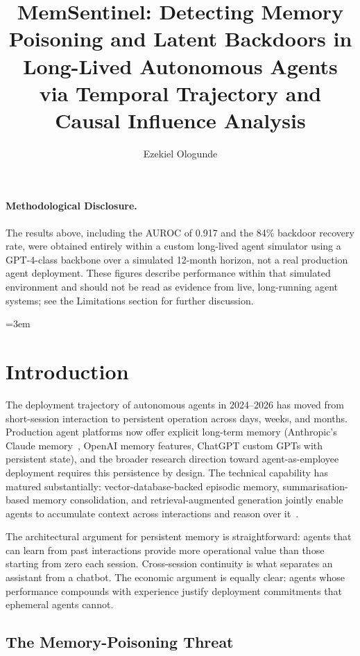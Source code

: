 \documentclass[sigconf,nonacm]{acmart}
\title{MemSentinel: Detecting Memory Poisoning and Latent Backdoors in Long-Lived Autonomous Agents via Temporal Trajectory and Causal Influence Analysis}
\author{Ezekiel Ologunde}
\affiliation{%
  \institution{Independent Researcher}
  \city{Boston}
  \state{MA}
  \country{USA}}
\begin{document}
\maketitle

\paragraph{Methodological Disclosure.} The results above, including the AUROC of 0.917 and the 84\% backdoor recovery rate, were obtained entirely within a custom long-lived agent simulator using a GPT-4-class backbone over a simulated 12-month horizon, not a real production agent deployment. These figures describe performance within that simulated environment and should not be read as evidence from live, long-running agent systems; see the Limitations section for further discussion.

\sloppy
{}
\emergencystretch=3em
\hfuzz=10pt

\section{Introduction}

The deployment trajectory of autonomous agents in 2024--2026 has
moved from short-session interaction to persistent operation
across days, weeks, and months. Production agent platforms now offer
explicit long-term memory (Anthropic's Claude memory~\cite{anthropic2024memory},
OpenAI memory features, ChatGPT custom GPTs with persistent state),
and the broader research direction toward agent-as-employee
deployment requires this persistence by design. The technical
capability has matured substantially: vector-database-backed
episodic memory, summarisation-based memory consolidation, and
retrieval-augmented generation jointly enable agents to accumulate
context across interactions and reason over it~\cite{park2023generative,
xi2024agentsurvey}.

The architectural argument for persistent memory is straightforward:
agents that can learn from past interactions provide more
operational value than those starting from zero each session.
Cross-session continuity is what separates an assistant from a
chatbot. The economic argument is equally clear: agents whose
performance compounds with experience justify deployment commitments
that ephemeral agents cannot.

\subsection{The Memory-Poisoning Threat}
\end{document}

